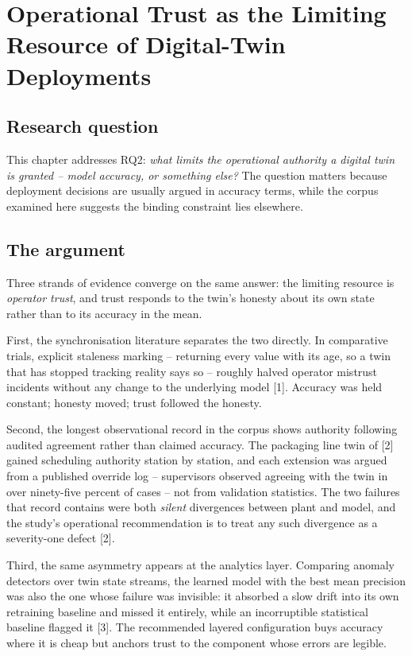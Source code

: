 \chapter{Operational Trust as the Limiting Resource of Digital-Twin
Deployments}\label{ch:trust}

\section{Research question}\label{sec:trust-rq}

This chapter addresses RQ2: \emph{what limits the operational authority
a digital twin is granted -- model accuracy, or something else?} The
question matters because deployment decisions are usually argued in
accuracy terms, while the corpus examined here suggests the binding
constraint lies elsewhere.

\section{The argument}\label{sec:trust-argument}

Three strands of evidence converge on the same answer: the limiting
resource is \emph{operator trust}, and trust responds to the twin's
honesty about its own state rather than to its accuracy in the mean.

First, the synchronisation literature separates the two directly. In
comparative trials, explicit staleness marking -- returning every value
with its age, so a twin that has stopped tracking reality says so --
roughly halved operator mistrust incidents without any change to the
underlying model {[}1{]}. Accuracy was held constant; honesty moved;
trust followed the honesty.

Second, the longest observational record in the corpus shows authority
following audited agreement rather than claimed accuracy. The packaging
line twin of {[}2{]} gained scheduling authority station by station, and
each extension was argued from a published override log -- supervisors
observed agreeing with the twin in over ninety-five percent of cases --
not from validation statistics. The two failures that record contains
were both \emph{silent} divergences between plant and model, and the
study's operational recommendation is to treat any such divergence as a
severity-one defect {[}2{]}.

Third, the same asymmetry appears at the analytics layer. Comparing
anomaly detectors over twin state streams, the learned model with the
best mean precision was also the one whose failure was invisible: it
absorbed a slow drift into its own retraining baseline and missed it
entirely, while an incorruptible statistical baseline flagged it
{[}3{]}. The recommended layered configuration buys accuracy where it is
cheap but anchors trust to the component whose errors are legible.

